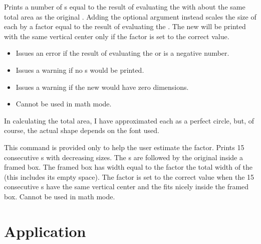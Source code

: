 \documentclass{beery}
\begin{document}
\begin{function}{\scaletextbullets}
  \begin{syntax}
  \end{syntax}
  Prints a number of s equal to the result of evaluating the  with about the same total area as the original .\footnotemark{}
  Adding the optional argument instead scales the size of each  by a factor equal to the result of evaluating the .
  The new  will be printed with the same vertical center only if the  factor is set to the correct value.

  \begin{itemize}
    \item
    Issues an error if the result of evaluating the  or  is a negative number.
    \item
    Issues a warning if no s would be printed.
    \item
    Issues a warning if the new  would have zero dimensions.
    \item
    Cannot be used in math mode.
  \end{itemize}
\end{function}
\footnotetext
  {%
    In calculating the total area, I have approximated each  as a perfect circle, but, of course, the actual shape depends on the font used.%
  }

\begin{function}{\scaletextbulletdebug}
  \begin{syntax}
  \end{syntax}
  This command is provided only to help the user estimate the  factor.
  Prints \num{15} consecutive s with decreasing sizes.
  The s are followed by the original  inside a framed box.
  The framed box has width equal to the  factor \texttimes{} the total width of the  (this includes its empty space).
  The  factor is set to the correct value when the \num{15} consecutive s have the same vertical center and the  fits nicely inside the framed box.
  Cannot be used in math mode.
\end{function}


\section{Application}
\label{sec:application}
\end{document}

